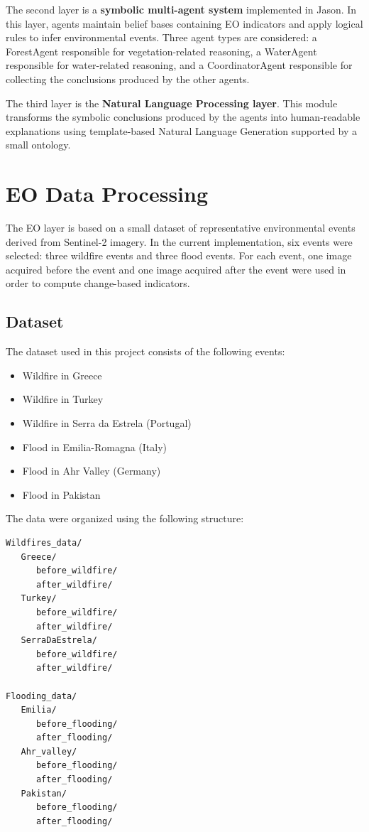 \documentclass[11pt,a4paper]{article}
\begin{document}
The second layer is a \textbf{symbolic multi-agent system} implemented in Jason. In this layer, agents maintain belief bases containing EO indicators and apply logical rules to infer environmental events. Three agent types are considered: a ForestAgent responsible for vegetation-related reasoning, a WaterAgent responsible for water-related reasoning, and a CoordinatorAgent responsible for collecting the conclusions produced by the other agents.

The third layer is the \textbf{Natural Language Processing layer}. This module transforms the symbolic conclusions produced by the agents into human-readable explanations using template-based Natural Language Generation supported by a small ontology.

\section{EO Data Processing}

The EO layer is based on a small dataset of representative environmental events derived from Sentinel-2 imagery. In the current implementation, six events were selected: three wildfire events and three flood events. For each event, one image acquired before the event and one image acquired after the event were used in order to compute change-based indicators.

\subsection{Dataset}

The dataset used in this project consists of the following events:

\begin{itemize}
\item Wildfire in Greece
\item Wildfire in Turkey
\item Wildfire in Serra da Estrela (Portugal)
\item Flood in Emilia-Romagna (Italy)
\item Flood in Ahr Valley (Germany)
\item Flood in Pakistan
\end{itemize}

The data were organized using the following structure:

\begin{verbatim}
Wildfires_data/
   Greece/
      before_wildfire/
      after_wildfire/
   Turkey/
      before_wildfire/
      after_wildfire/
   SerraDaEstrela/
      before_wildfire/
      after_wildfire/

Flooding_data/
   Emilia/
      before_flooding/
      after_flooding/
   Ahr_valley/
      before_flooding/
      after_flooding/
   Pakistan/
      before_flooding/
      after_flooding/
\end{verbatim}
\end{document}
